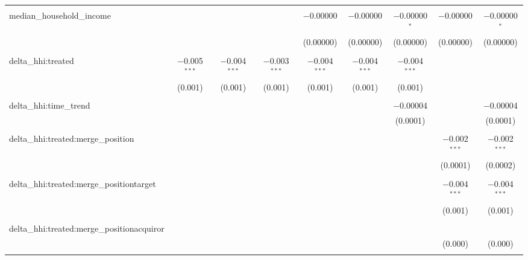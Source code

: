 \begin{table}[H]
{\begin{tabular}{@{\extracolsep{5pt}}lcccccccc}
   & & & & & & & & \\  

  median\_household\_income &  &  &  & $-$0.00000 & $-$0.00000 & $-$0.00000$^{*}$ & $-$0.00000 & $-$0.00000$^{*}$ \\  

   &  &  &  & (0.00000) & (0.00000) & (0.00000) & (0.00000) & (0.00000) \\  

   & & & & & & & & \\  

  delta\_hhi:treated & $-$0.005$^{***}$ & $-$0.004$^{***}$ & $-$0.003$^{***}$ & $-$0.004$^{***}$ & $-$0.004$^{***}$ & $-$0.004$^{***}$ &  &  \\  

   & (0.001) & (0.001) & (0.001) & (0.001) & (0.001) & (0.001) &  &  \\  

   & & & & & & & & \\  

  delta\_hhi:time\_trend &  &  &  &  &  & $-$0.00004 &  & $-$0.00004 \\  

   &  &  &  &  &  & (0.0001) &  & (0.0001) \\  

   & & & & & & & & \\  

  delta\_hhi:treated:merge\_position &  &  &  &  &  &  & $-$0.002$^{***}$ & $-$0.002$^{***}$ \\  

   &  &  &  &  &  &  & (0.0001) & (0.0002) \\  

   & & & & & & & & \\  

  delta\_hhi:treated:merge\_positiontarget &  &  &  &  &  &  & $-$0.004$^{***}$ & $-$0.004$^{***}$ \\  

   &  &  &  &  &  &  & (0.001) & (0.001) \\  

   & & & & & & & & \\  

  delta\_hhi:treated:merge\_positionacquiror &  &  &  &  &  &  &  &  \\  

   &  &  &  &  &  &  & (0.000) & (0.000) \\  

   & & & & & & & & \\  


\end{tabular}}
\end{table}
